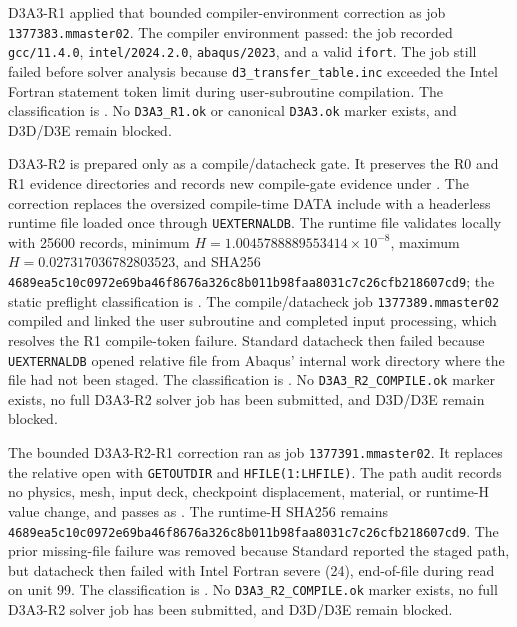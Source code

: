 \documentclass[11pt,a4paper]{article}
\begin{document}
D3A3-R1 applied that bounded compiler-environment correction as job
\texttt{1377383.mmaster02}. The compiler environment passed: the job recorded
\texttt{gcc/11.4.0}, \texttt{intel/2024.2.0}, \texttt{abaqus/2023}, and a
valid \texttt{ifort}. The job still failed before solver analysis because
\texttt{d3\_transfer\_table.inc} exceeded the Intel Fortran statement token
limit during user-subroutine compilation. The classification is
. No \texttt{D3A3\_R1.ok}
or canonical \texttt{D3A3.ok} marker exists, and D3D/D3E remain blocked.

D3A3-R2 is prepared only as a compile/datacheck gate. It preserves the R0 and
R1 evidence directories and records new compile-gate evidence under
.
The correction replaces the oversized compile-time DATA include with a
headerless runtime  file loaded once through
\texttt{UEXTERNALDB}. The runtime file validates locally with 25600 records,
minimum $H=1.0045788889553414\times10^{-8}$, maximum
$H=0.027317036782803523$, and SHA256
\texttt{4689ea5c10c0972e69ba46f8676a326c8b011b98faa8031c7c26cfb218607cd9};
the static preflight classification is .
The compile/datacheck job \texttt{1377389.mmaster02} compiled and linked the
user subroutine and completed input processing, which resolves the R1
compile-token failure. Standard datacheck then failed because
\texttt{UEXTERNALDB} opened relative file  from
Abaqus' internal  work directory where the file had not been
staged. The classification is
. No
\texttt{D3A3\_R2\_COMPILE.ok} marker exists, no full D3A3-R2 solver job has
been submitted, and D3D/D3E remain blocked.

The bounded D3A3-R2-R1 correction ran as job \texttt{1377391.mmaster02}. It
replaces the relative  open with \texttt{GETOUTDIR} and
\texttt{HFILE(1:LHFILE)}. The path audit records no physics, mesh, input deck,
checkpoint displacement, material, or runtime-H value change, and passes as
. The runtime-H SHA256 remains
\texttt{4689ea5c10c0972e69ba46f8676a326c8b011b98faa8031c7c26cfb218607cd9}.
The prior  missing-file failure was removed because Standard
reported the staged  path, but datacheck
then failed with Intel Fortran severe (24), end-of-file during read on unit 99.
The classification is
. No
\texttt{D3A3\_R2\_COMPILE.ok} marker exists, no full D3A3-R2 solver job has
been submitted, and D3D/D3E remain blocked.
\end{document}
